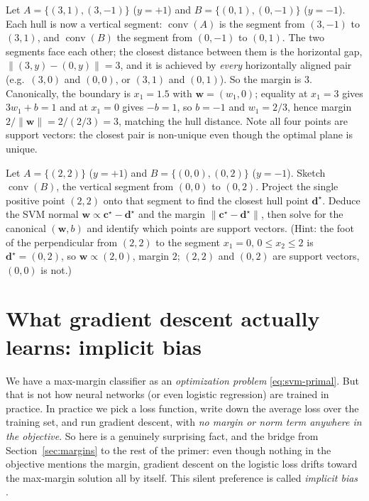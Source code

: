 \begin{example}
\label{ex:foursegment}
Let $A = \{(3,1),(3,-1)\}$ ($y=+1$) and $B = \{(0,1),(0,-1)\}$ ($y=-1$).
Each hull is now a vertical segment: $\operatorname{conv}(A)$ is the
segment from $(3,-1)$ to $(3,1)$, and $\operatorname{conv}(B)$ the segment
from $(0,-1)$ to $(0,1)$. The two segments face each other; the closest
distance between them is the horizontal gap, $\|(3,y)-(0,y)\| = 3$, and it
is achieved by \emph{every} horizontally aligned pair (e.g.\ $(3,0)$ and
$(0,0)$, or $(3,1)$ and $(0,1)$). So the margin is $3$. Canonically, the
boundary is $x_1 = 1.5$ with $\mathbf{w}=(w_1,0)$; equality at $x_1=3$
gives $3w_1 + b = 1$ and at $x_1 = 0$ gives $-b = 1$, so $b = -1$ and
$w_1 = 2/3$, hence margin $2/\|\mathbf{w}\| = 2/(2/3) = 3$, matching the
hull distance. Note all four points are support vectors: the closest pair
is non-unique even though the optimal plane is unique.
\end{example}

\begin{problem}
\label{ex:pointsegment}
Let $A=\{(2,2)\}$ ($y=+1$) and $B=\{(0,0),(0,2)\}$ ($y=-1$). Sketch
$\operatorname{conv}(B)$, the vertical segment from $(0,0)$ to $(0,2)$.
Project the single positive point $(2,2)$ onto that segment to find the
closest hull point $\mathbf{d}^\star$. Deduce the SVM normal
$\mathbf{w}\propto\mathbf{c}^\star-\mathbf{d}^\star$ and the margin
$\|\mathbf{c}^\star-\mathbf{d}^\star\|$, then solve for the canonical
$(\mathbf{w},b)$ and identify which points are support vectors. (Hint:
the foot of the perpendicular from $(2,2)$ to the segment $x_1=0,\,
0\le x_2\le 2$ is $\mathbf{d}^\star = (0,2)$, so $\mathbf{w}\propto(2,0)$,
margin $2$; $(2,2)$ and $(0,2)$ are support vectors, $(0,0)$ is not.)
\end{problem}


\section{What gradient descent actually learns: implicit bias}
\label{sec:implicit}

We have a max-margin classifier as an \emph{optimization problem}
\eqref{eq:svm-primal}. But that is not how neural networks (or even
logistic regression) are trained in practice. In practice we pick a loss
function, write down the average loss over the training set, and run
gradient descent, with \emph{no margin or norm term anywhere in the
objective}. So here is a genuinely surprising fact, and the bridge from
Section~\ref{sec:margins} to the rest of the primer: even though nothing
in the objective mentions the margin, gradient descent on the logistic
loss drifts toward the max-margin solution all by itself. This silent
preference is called \emph{implicit bias} \citep{soudry2018}.

